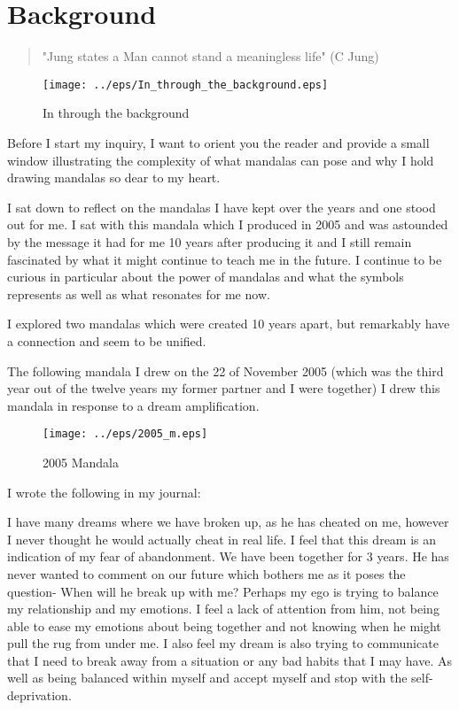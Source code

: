 \chapter{Background}
\begin{quote}
"Jung states a Man cannot stand a meaningless life" (C Jung) 
\end{quote}

\newpage
\begin{figure}[h!]
\begin{center}
\texttt{[image: ../eps/In\_through\_the\_background.eps]}
\caption{In through the background}
\label{label}
\end{center}
\end{figure}

\newpage
Before I start my inquiry, I want to orient you the reader and provide a small window illustrating the complexity of what mandalas can pose and why I hold drawing mandalas so dear to my heart. 

I sat down to reflect on the mandalas I have kept over the years and one stood out for me. I sat with this mandala which I produced in 2005 and was astounded by the message it had for me 10 years after producing it and I still remain fascinated by what it might continue to teach me in the future. I continue to be curious in particular about the power of mandalas and what the symbols represents as well as what resonates for me now. 

I explored two mandalas which were created 10 years apart, but remarkably have a connection and seem to be unified.   

The following mandala I drew on the 22 of November 2005 (which was the third year out of the twelve years my former partner and I were together) I drew this mandala in response to a dream amplification. 

\begin{figure}[!thbp]
\begin{center}
\texttt{[image: ../eps/2005\_m.eps]} 
\caption{2005 Mandala}
\label{figure}
\end{center}
\end{figure}


I wrote the following in my journal: \newline 

I have many dreams where we have broken up, as he has cheated on me, however I never thought he would actually cheat in real life. I feel that this dream is an indication of my fear of abandonment. We have been together for 3 years. He has never wanted to comment on our future which bothers me as it poses the question- When will he break up with me? Perhaps my ego is trying to balance my relationship and my emotions. I feel a lack of attention from him, not being able to ease my emotions about being together and not knowing when he might pull the rug from under me. I also feel my dream is also trying to communicate that I need to break away from a situation or any bad habits that I may have. As well as being balanced within myself and accept myself and stop with the self-deprivation.  

